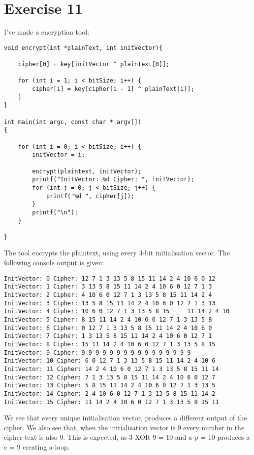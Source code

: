 \documentclass[a4paper,12pt]{article}
\begin{document}
\section*{Exercise 11}
I've made a encryption tool:
\begin{verbatim}
void encrypt(int *plainText, int initVector){
    
    cipher[0] = key[initVector ^ plainText[0]];
    
    for (int i = 1; i < bitSize; i++) {
        cipher[i] = key[cipher[i - 1] ^ plainText[i]];
    }
}

int main(int argc, const char * argv[])
{   
   
    for (int i = 0; i < bitSize; i++) {
        initVector = i;
        
        encrypt(plaintext, initVector);
        printf("InitVector: %d Cipher: ", initVector);
        for (int j = 0; j < bitSize; j++) {
            printf("%d ", cipher[j]);
        }
        printf("\n");
    }
  
}
\end{verbatim}
The tool encrypts the plaintext, using every 4-bit initialisation vector. The following console output is given:
\begin{verbatim}
InitVector: 0 Cipher: 12 7 1 3 13 5 8 15 11 14 2 4 10 6 0 12 
InitVector: 1 Cipher: 3 13 5 8 15 11 14 2 4 10 6 0 12 7 1 3 
InitVector: 2 Cipher: 4 10 6 0 12 7 1 3 13 5 8 15 11 14 2 4 
InitVector: 3 Cipher: 13 5 8 15 11 14 2 4 10 6 0 12 7 1 3 13 
InitVector: 4 Cipher: 10 6 0 12 7 1 3 13 5 8 15 	11 14 2 4 10 
InitVector: 5 Cipher: 8 15 11 14 2 4 10 6 0 12 7 1 3 13 5 8 
InitVector: 6 Cipher: 0 12 7 1 3 13 5 8 15 11 14 2 4 10 6 0 
InitVector: 7 Cipher: 1 3 13 5 8 15 11 14 2 4 10 6 0 12 7 1 
InitVector: 8 Cipher: 15 11 14 2 4 10 6 0 12 7 1 3 13 5 8 15 
InitVector: 9 Cipher: 9 9 9 9 9 9 9 9 9 9 9 9 9 9 9 9 
InitVector: 10 Cipher: 6 0 12 7 1 3 13 5 8 15 11 14 2 4 10 6 
InitVector: 11 Cipher: 14 2 4 10 6 0 12 7 1 3 13 5 8 15 11 14 
InitVector: 12 Cipher: 7 1 3 13 5 8 15 11 14 2 4 10 6 0 12 7 
InitVector: 13 Cipher: 5 8 15 11 14 2 4 10 6 0 12 7 1 3 13 5 
InitVector: 14 Cipher: 2 4 10 6 0 12 7 1 3 13 5 8 15 11 14 2 
InitVector: 15 Cipher: 11 14 2 4 10 6 0 12 7 1 3 13 5 8 15 11 
\end{verbatim}
We see that every unique initialisation vector, produces a different output of the cipher. We also see that, when the initialisation vector is 9 every number in the cipher text is also 9. This is expected, as 3 XOR 9 = 10 and a p = 10 produces a c = 9 creating a loop.
\end{document}
